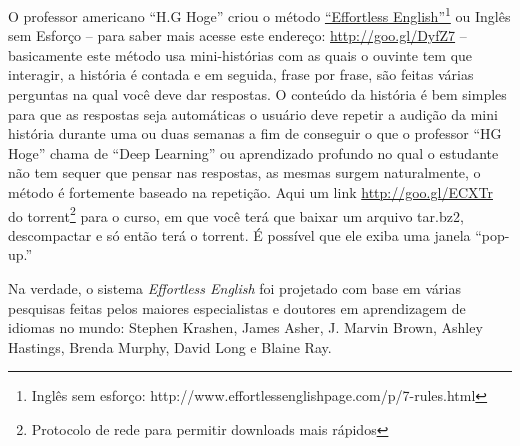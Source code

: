 O professor americano  ``H.G Hoge'' criou o método 
\href{http://www.effortlessenglishpage.com/p/7-rules.html}{``Effortless
English''}\footnote{Inglês sem esforço:
http://www.effortlessenglishpage.com/p/7-rules.html} ou  Inglês sem Esforço
-- para saber mais acesse este endereço:
\href{http://goo.gl/DyfZ7}{http://goo.gl/DyfZ7} -- basicamente este método usa
mini-histórias com as quais o ouvinte tem que interagir, a história é contada
e em seguida, frase por frase, são feitas várias perguntas na qual você deve
dar respostas. O conteúdo da história é bem simples para que as respostas seja
automáticas o usuário deve repetir a audição da mini história durante uma ou
duas semanas a fim de conseguir o que o professor ``HG Hoge'' chama de ``Deep
Learning'' ou aprendizado profundo no qual o estudante não tem sequer que pensar
nas respostas, as mesmas surgem naturalmente, o método é fortemente baseado na
repetição. Aqui um link
\href{http://goo.gl/ECXTr}{http://goo.gl/ECXTr}
do torrent\footnote{Protocolo de rede para permitir downloads mais rápidos}
para o curso, em que você terá que baixar um arquivo tar.bz2, descompactar e só
então terá o torrent. {\footnotesize {} É possível que ele exiba uma
janela ``pop-up.''}

Na verdade, o sistema {\em Effortless English} foi projetado com base em várias
pesquisas feitas pelos maiores especialistas e doutores em aprendizagem de idiomas no
mundo: Stephen Krashen, James Asher, J. Marvin Brown, Ashley Hastings, Brenda Murphy, David Long e Blaine Ray.

\vspace{0.3\baselineskip} 

\vspace{0.3\baselineskip} 

\vspace{0.3\baselineskip} 


